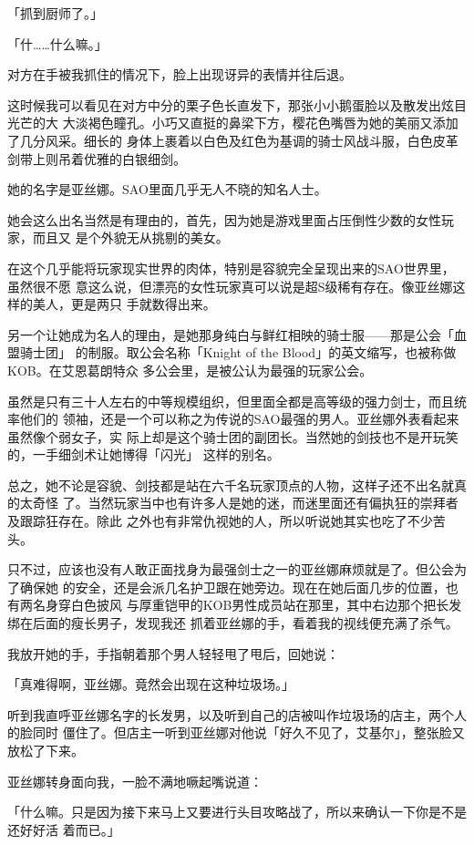 \documentclass[11pt]{book}
\begin{document}
「抓到厨师了。」

「什……什么嘛。」

对方在手被我抓住的情况下，脸上出现讶异的表情并往后退。

这时候我可以看见在对方中分的栗子色长直发下，那张小小鹅蛋脸以及散发出炫目光芒的大
大淡褐色瞳孔。小巧又直挺的鼻梁下方，樱花色嘴唇为她的美丽又添加了几分风采。细长的
身体上裹着以白色及红色为基调的骑士风战斗服，白色皮革剑带上则吊着优雅的白银细剑。

她的名字是亚丝娜。SAO里面几乎无人不晓的知名人士。

她会这么出名当然是有理由的，首先，因为她是游戏里面占压倒性少数的女性玩家，而且又
是个外貌无从挑剔的美女。

在这个几乎能将玩家现实世界的肉体，特别是容貌完全呈现出来的SAO世界里，虽然很不愿
意这么说，但漂亮的女性玩家真可以说是超S级稀有存在。像亚丝娜这样的美人，更是两只
手就数得出来。

另一个让她成为名人的理由，是她那身纯白与鲜红相映的骑士服——那是公会「血盟骑士团」
的制服。取公会名称「Knight of the Blood」的英文缩写，也被称做KOB。在艾恩葛朗特众
多公会里，是被公认为最强的玩家公会。

虽然是只有三十人左右的中等规模组织，但里面全都是高等级的强力剑士，而且统率他们的
领袖，还是一个可以称之为传说的SAO最强的男人。亚丝娜外表看起来虽然像个弱女子，实
际上却是这个骑士团的副团长。当然她的剑技也不是开玩笑的，一手细剑术让她博得「闪光」
这样的别名。

总之，她不论是容貌、剑技都是站在六千名玩家顶点的人物，这样子还不出名就真的太奇怪
了。当然玩家当中也有许多人是她的迷，而迷里面还有偏执狂的崇拜者及跟踪狂存在。除此
之外也有非常仇视她的人，所以听说她其实也吃了不少苦头。

只不过，应该也没有人敢正面找身为最强剑士之一的亚丝娜麻烦就是了。但公会为了确保她
的安全，还是会派几名护卫跟在她旁边。现在在她后面几步的位置，也有两名身穿白色披风
与厚重铠甲的KOB男性成员站在那里，其中右边那个把长发绑在后面的瘦长男子，发现我还
抓着亚丝娜的手，看着我的视线便充满了杀气。

我放开她的手，手指朝着那个男人轻轻甩了甩后，回她说：

「真难得啊，亚丝娜。竟然会出现在这种垃圾场。」

听到我直呼亚丝娜名字的长发男，以及听到自己的店被叫作垃圾场的店主，两个人的脸同时
僵住了。但店主一听到亚丝娜对他说「好久不见了，艾基尔」，整张脸又放松了下来。

亚丝娜转身面向我，一脸不满地噘起嘴说道：

「什么嘛。只是因为接下来马上又要进行头目攻略战了，所以来确认一下你是不是还好好活
着而已。」
\end{document}
